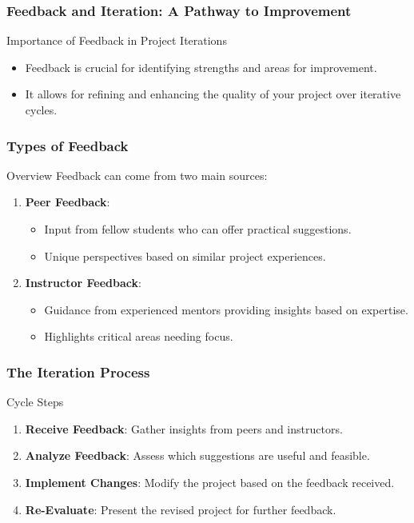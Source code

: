 \documentclass[aspectratio=169]{beamer}
\begin{document}
\begin{frame}[fragile]
    \frametitle{Feedback and Iteration: A Pathway to Improvement}
    \begin{block}{Importance of Feedback in Project Iterations}
        \begin{itemize}
            \item Feedback is crucial for identifying strengths and areas for improvement.
            \item It allows for refining and enhancing the quality of your project over iterative cycles.
        \end{itemize}
    \end{block}
\end{frame}

\begin{frame}[fragile]
    \frametitle{Types of Feedback}
    \begin{block}{Overview}
        Feedback can come from two main sources:
    \end{block}
    \begin{enumerate}
        \item \textbf{Peer Feedback}: 
            \begin{itemize}
                \item Input from fellow students who can offer practical suggestions.
                \item Unique perspectives based on similar project experiences.
            \end{itemize}
        \item \textbf{Instructor Feedback}:
            \begin{itemize}
                \item Guidance from experienced mentors providing insights based on expertise.
                \item Highlights critical areas needing focus.
            \end{itemize}
    \end{enumerate}
\end{frame}

\begin{frame}[fragile]
    \frametitle{The Iteration Process}
    \begin{block}{Cycle Steps}
        \begin{enumerate}
            \item \textbf{Receive Feedback}: Gather insights from peers and instructors.
            \item \textbf{Analyze Feedback}: Assess which suggestions are useful and feasible.
            \item \textbf{Implement Changes}: Modify the project based on the feedback received.
            \item \textbf{Re-Evaluate}: Present the revised project for further feedback.
        \end{enumerate}
    \end{block}
\end{frame}
\end{document}
